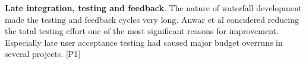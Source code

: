 {\bfseries Late integration, testing and feedback}. The nature of
waterfall development made the testing and feedback cycles very long.
Anwar et al concidered reducing the total testing effort one of the most
significant reasons for improvement. Especially late user acceptance
testing had caused major budget overruns in several projects. [P1]
